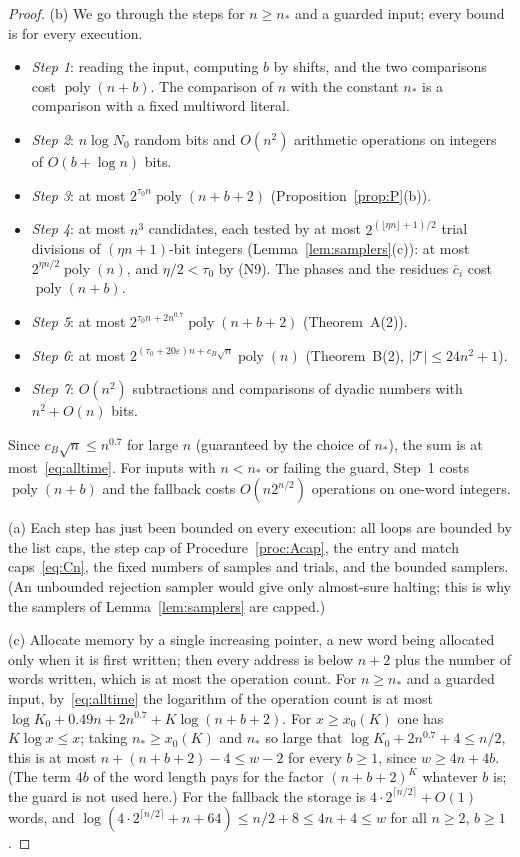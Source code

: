 \documentclass[11pt]{article}
\theoremstyle{definition}
\newcommand{\eps}{\varepsilon}
\newcommand{\bc}{\bar c}
\newcommand{\abs}[1]{\lvert #1\rvert}
\newcommand{\floor}[1]{\lfloor #1\rfloor}
\newcommand{\ceil}[1]{\lceil #1\rceil}
\newcommand{\poly}{\operatorname{poly}}
\newcommand{\cT}{\mathcal T}
\begin{document}
\begin{proof}
(b) We go through the steps for $n\ge n_\ast$ and a guarded input; every bound is for every execution.
\begin{itemize}
\item \emph{Step 1}: reading the input, computing $b$ by shifts, and the two comparisons cost $\poly(n+b)$. The
comparison of $n$ with the constant $n_\ast$ is a comparison with a fixed multiword literal.
\item \emph{Step 2}: $n\log N_0$ random bits and $O(n^2)$ arithmetic operations on integers of $O(b+\log n)$ bits.
\item \emph{Step 3}: at most $2^{\tau_0n}\poly(n+b+2)$ (Proposition~\ref{prop:P}(b)).
\item \emph{Step 4}: at most $n^3$ candidates, each tested by at most $2^{(\floor{\eta n}+1)/2}$ trial divisions of
$(\eta n+1)$-bit integers (Lemma~\ref{lem:samplers}(c)): at most $2^{\eta n/2}\poly(n)$, and $\eta/2<\tau_0$ by
\textup{(N9)}. The phases and the residues $\bc_i$ cost $\poly(n+b)$.
\item \emph{Step 5}: at most $2^{\tau_0n+2n^{0.7}}\poly(n+b+2)$ (Theorem~A(2)).
\item \emph{Step 6}: at most $2^{(\tau_0+20\eps)n+c_B\sqrt n}\poly(n)$ (Theorem~B(2), $\abs\cT\le24n^2+1$).
\item \emph{Step 7}: $O(n^2)$ subtractions and comparisons of dyadic numbers with $n^2+O(n)$ bits.
\end{itemize}
Since $c_B\sqrt n\le n^{0.7}$ for large $n$ (guaranteed by the choice of $n_\ast$), the sum is at
most~\eqref{eq:alltime}. For inputs with $n<n_\ast$ or failing the guard, Step~1 costs $\poly(n+b)$ and the fallback
costs $O(n2^{n/2})$ operations on one-word integers.

(a) Each step has just been bounded on every execution: all loops are bounded by the list caps, the step cap of
Procedure~\ref{proc:Acap}, the entry and match caps~\eqref{eq:Cn}, the fixed numbers of samples and trials, and the
bounded samplers. (An unbounded rejection sampler would give only almost-sure halting; this is why the samplers of
Lemma~\ref{lem:samplers} are capped.)

(c) Allocate memory by a single increasing pointer, a new word being allocated only when it is first written; then
every address is below $n+2$ plus the number of words written, which is at most the operation count. For
$n\ge n_\ast$ and a guarded input, by~\eqref{eq:alltime} the logarithm of the operation count is at most
$\log K_0+0.49n+2n^{0.7}+K\log(n+b+2)$. For $x\ge x_0(K)$ one has $K\log x\le x$; taking $n_\ast\ge x_0(K)$ and
$n_\ast$ so large that $\log K_0+2n^{0.7}+4\le n/2$, this is at most $n+(n+b+2)-4\le w-2$ for every $b\ge1$, since
$w\ge4n+4b$. (The term $4b$ of the word length pays for the factor $(n+b+2)^K$ whatever $b$ is; the guard is not
used here.) For the fallback the storage is $4\cdot2^{\ceil{n/2}}+O(1)$ words, and
$\log(4\cdot2^{\ceil{n/2}}+n+64)\le n/2+8\le4n+4\le w$ for all $n\ge2$, $b\ge1$.
\end{proof}
\end{document}
